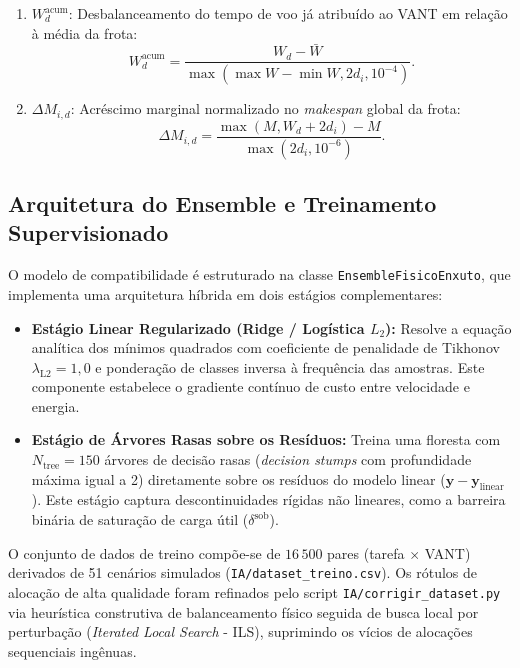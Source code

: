 \begin{enumerate}
\begin{equation}
    \end{equation}
    \item $W^{\text{acum}}_d$: Desbalanceamento do tempo de voo já atribuído ao VANT em relação à média da frota:
    \begin{equation}\label{eq:feat_carga_acum}
    W^{\text{acum}}_d = \frac{W_d - \bar{W}}{\max(\max W - \min W, 2 d_i, 10^{-4})}.
    \end{equation}
    \item $\Delta M_{i, d}$: Acréscimo marginal normalizado no \textit{makespan} global da frota:
    \begin{equation}\label{eq:feat_delta_m}
    \Delta M_{i, d} = \frac{\max(M, W_d + 2 d_i) - M}{\max(2 d_i, 10^{-6})}.
    \end{equation}
\end{enumerate}

\subsection{Arquitetura do Ensemble e Treinamento Supervisionado}

O modelo de compatibilidade é estruturado na classe \texttt{EnsembleFisicoEnxuto}, que implementa uma arquitetura híbrida em dois estágios complementares:
\begin{itemize}
    \item \textbf{Estágio Linear Regularizado (Ridge / Logística $L_2$):} Resolve a equação analítica dos mínimos quadrados com coeficiente de penalidade de Tikhonov $\lambda_{\text{L2}} = 1{,}0$ e ponderação de classes inversa à frequência das amostras. Este componente estabelece o gradiente contínuo de custo entre velocidade e energia.
    \item \textbf{Estágio de Árvores Rasas sobre os Resíduos:} Treina uma floresta com $N_{\text{tree}} = 150$ árvores de decisão rasas (\textit{decision stumps} com profundidade máxima igual a 2) diretamente sobre os resíduos do modelo linear ($\mathbf{y} - \mathbf{y}_{\text{linear}}$). Este estágio captura descontinuidades rígidas não lineares, como a barreira binária de saturação de carga útil ($\delta^{\text{sob}}$).
\end{itemize}

O conjunto de dados de treino compõe-se de $16\,500$ pares (tarefa $\times$ VANT) derivados de 51 cenários simulados (\texttt{IA/dataset\_treino.csv}). Os rótulos de alocação de alta qualidade foram refinados pelo script \texttt{IA/corrigir\_dataset.py} via heurística construtiva de balanceamento físico seguida de busca local por perturbação (\textit{Iterated Local Search} - ILS), suprimindo os vícios de alocações sequenciais ingênuas.


